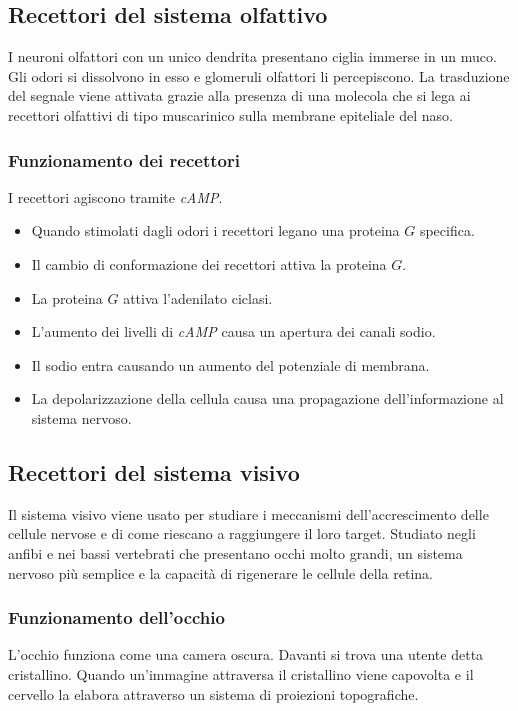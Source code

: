 	
	\subsection{Recettori del sistema olfattivo}
	I neuroni olfattori con un unico dendrita presentano ciglia immerse in un muco.
	Gli odori si dissolvono in esso e glomeruli olfattori li percepiscono.
	La trasduzione del segnale viene attivata grazie alla presenza di una molecola che si lega ai recettori olfattivi di tipo muscarinico sulla membrane epiteliale del naso.

		\subsubsection{Funzionamento dei recettori}
		I recettori agiscono tramite \emph{cAMP}.
		\begin{multicols}{2}
			\begin{itemize}
				\item Quando stimolati dagli odori i recettori legano una proteina $G$ specifica.
				\item Il cambio di conformazione dei recettori attiva la proteina $G$.
				\item La proteina $G$ attiva l'adenilato ciclasi.
				\item L'aumento dei livelli di \emph{cAMP} causa un apertura dei canali sodio.
				\item Il sodio entra causando un aumento del potenziale di membrana.
				\item La depolarizzazione della cellula causa una propagazione dell'informazione al sistema nervoso.
			\end{itemize}
		\end{multicols}

	\subsection{Recettori del sistema visivo}
	Il sistema visivo viene usato per studiare i meccanismi dell'accrescimento delle cellule nervose e di come riescano a raggiungere il loro target.
	Studiato negli anfibi e nei bassi vertebrati che presentano occhi molto grandi, un sistema nervoso pi\`u semplice e la capacit\`a di rigenerare le cellule della retina.
	
		\subsubsection{Funzionamento dell'occhio}
		L'occhio funziona come una camera oscura.
		Davanti si trova una utente detta cristallino.
		Quando un'immagine attraversa il cristallino viene capovolta e il cervello la elabora attraverso un sistema di proiezioni topografiche.
		
